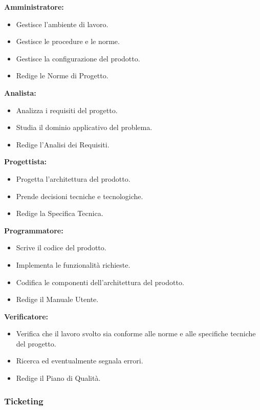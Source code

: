 \textbf{Amministratore:}
\begin{itemize}
    \item Gestisce l’ambiente di lavoro.
    \item Gestisce le procedure e le norme.
    \item Gestisce la configurazione del prodotto.
    \item Redige le Norme di Progetto.
\end{itemize}

\textbf{Analista:}
\begin{itemize}
    \item Analizza i requisiti del progetto.
    \item Studia il dominio applicativo del problema.
    \item Redige l’Analisi dei Requisiti.
\end{itemize}

\textbf{Progettista:}
\begin{itemize}
    \item Progetta l’architettura del prodotto.
    \item Prende decisioni tecniche e tecnologiche.
    \item Redige la Specifica Tecnica.
\end{itemize}

\textbf{Programmatore:}
\begin{itemize}
    \item Scrive il codice del prodotto.
    \item Implementa le funzionalità richieste.
    \item Codifica le componenti dell’architettura del prodotto.
    \item Redige il Manuale Utente.
\end{itemize}

\textbf{Verificatore:}
\begin{itemize}
    \item Verifica che il lavoro svolto sia conforme alle norme e alle specifiche tecniche del progetto.
    \item Ricerca ed eventualmente segnala errori.
    \item Redige il Piano di Qualità.
\end{itemize}

\subsubsection{Ticketing}

